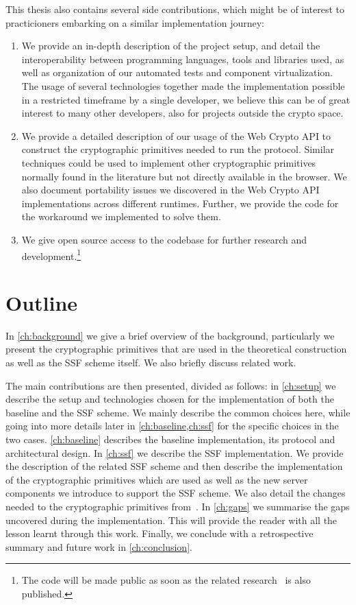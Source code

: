 This thesis also contains several side contributions, 
which might be of interest to
practicioners embarking on a similar implementation journey:
\begin{enumerate}
    \item We provide an in-depth description of the project 
    setup, and detail the interoperability between programming
    languages, tools and libraries used, as well as 
    organization of our automated tests and component 
    virtualization. The usage of several technologies 
    together made the implementation possible in a 
    restricted timeframe by a single developer, 
    we believe this can be of great interest to many other 
    developers, also for projects outside the crypto space.
    \item We provide a detailed description of our usage of 
    the Web Crypto API to construct the cryptographic 
    primitives needed to run the protocol. 
    Similar techniques could be used to implement other 
    cryptographic primitives normally found in the 
    literature but not directly available in the browser. 
    We also document portability issues we discovered
    in the Web Crypto API implementations across different 
    runtimes. Further, we provide the code for the workaround 
    we implemented to solve them.
    \item We give open source access to the codebase for 
    further research and development.\footnote{The code will be made public as soon as the related research~\cite{GKP} is also published.}
\end{enumerate}

\section{Outline}\label{sc:outline}

In \cref{ch:background} we give a brief overview of the background, particularly 
we present the cryptographic primitives that are used in the theoretical construction 
as well as the SSF scheme itself. We also briefly discuss related work. 

The main contributions are then presented, divided as follows: 
in \cref{ch:setup} we describe the setup and technologies 
chosen for the implementation of both the baseline and 
the SSF scheme. We mainly describe the common choices here,
while going into more details later 
in \cref{ch:baseline,ch:ssf} for the specific choices 
in the two cases.
\cref{ch:baseline} describes the baseline implementation, 
its protocol and architectural design.
In \cref{ch:ssf} we describe the SSF implementation. 
We provide the description of the related SSF scheme and then 
describe the implementation of the cryptographic
primitives which are used as well as the new server components
we introduce to support the SSF scheme. We
also detail the changes needed to the cryptographic primitives
from~\cite{GKP}.
In \cref{ch:gaps} we summarise the gaps uncovered during 
the implementation. This will provide the reader with 
all the lesson learnt through this work.
Finally, we conclude with a retrospective summary
and future work in \cref{ch:conclusion}.

